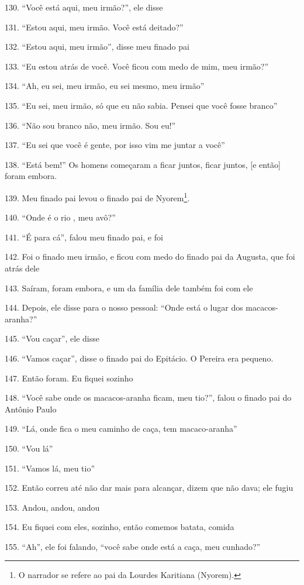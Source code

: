 130. ``Você está aqui, meu irmão?'', ele disse

131. ``Estou aqui, meu irmão. Você está deitado?''

132. ``Estou aqui, meu irmão'', disse meu finado pai

133. ``Eu estou atrás de você. Você ficou com medo de mim, meu irmão?''

134. ``Ah, eu sei, meu irmão, eu sei mesmo, meu irmão''

135. ``Eu sei, meu irmão, só que eu não sabia. Pensei que você fosse branco''

136. ``Não sou branco não, meu irmão. Sou eu!''

137. ``Eu sei que você é gente, por isso vim me juntar a você''

138. ``Está bem!'' Os homens começaram a ficar juntos, ficar juntos, {[}e então{]} foram embora.

139. Meu finado pai levou o finado pai de Nyorem\footnote{O narrador se
  refere ao pai da Lourdes Karitiana (Nyorem).}.

140. ``Onde é o rio , meu avô?''

141. ``É para cá'', falou meu finado pai, e foi

142. Foi o finado meu irmão, e ficou com medo do finado pai da Augusta,
que foi atrás dele

143. Saíram, foram embora, e um da família dele também foi com ele

144. Depois, ele disse para o nosso pessoal: ``Onde está o lugar dos
macacos- aranha?''

145. ``Vou caçar'', ele disse

146. ``Vamos caçar'', disse o finado pai do Epitácio. O Pereira era pequeno.

147. Então foram. Eu fiquei sozinho

148. ``Você sabe onde os macacos-aranha ficam, meu tio?'', falou o finado pai do Antônio Paulo

149. ``Lá, onde fica o meu caminho de caça, tem macaco-aranha''

150. ``Vou lá''

151. ``Vamos lá, meu tio''

152. Então correu até não dar mais para alcançar, dizem que não dava; ele fugiu

153. Andou, andou, andou

154. Eu fiquei com eles, sozinho, então comemos batata, comida

155. ``Ah'', ele foi falando, ``você sabe onde está a caça, meu cunhado?''

